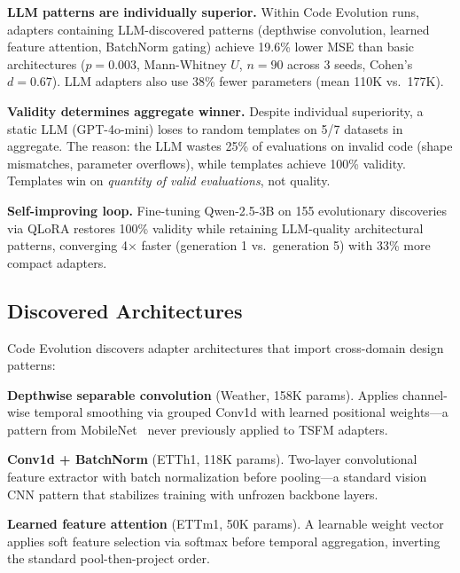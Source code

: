 \documentclass{article}
\begin{document}
\textbf{LLM patterns are individually superior.} Within Code Evolution runs, adapters containing LLM-discovered patterns (depthwise convolution, learned feature attention, BatchNorm gating) achieve 19.6\% lower MSE than basic architectures ($p{=}0.003$, Mann-Whitney $U$, $n{=}90$ across 3 seeds, Cohen's $d{=}0.67$). LLM adapters also use 38\% fewer parameters (mean 110K vs.\ 177K).

\textbf{Validity determines aggregate winner.} Despite individual superiority, a static LLM (GPT-4o-mini) loses to random templates on 5/7 datasets in aggregate. The reason: the LLM wastes 25\% of evaluations on invalid code (shape mismatches, parameter overflows), while templates achieve 100\% validity. Templates win on \textit{quantity of valid evaluations}, not quality.

\textbf{Self-improving loop.} Fine-tuning Qwen-2.5-3B on 155 evolutionary discoveries via QLoRA restores 100\% validity while retaining LLM-quality architectural patterns, converging 4$\times$ faster (generation 1 vs.\ generation 5) with 33\% more compact adapters.

\subsection{Discovered Architectures}

Code Evolution discovers adapter architectures that import cross-domain design patterns:

\textbf{Depthwise separable convolution} (Weather, 158K params). Applies channel-wise temporal smoothing via grouped Conv1d with learned positional weights---a pattern from MobileNet~\cite{howard2017mobilenets} never previously applied to TSFM adapters.

\textbf{Conv1d + BatchNorm} (ETTh1, 118K params). Two-layer convolutional feature extractor with batch normalization before pooling---a standard vision CNN pattern that stabilizes training with unfrozen backbone layers.

\textbf{Learned feature attention} (ETTm1, 50K params). A learnable weight vector applies soft feature selection via softmax before temporal aggregation, inverting the standard pool-then-project order.
\end{document}
